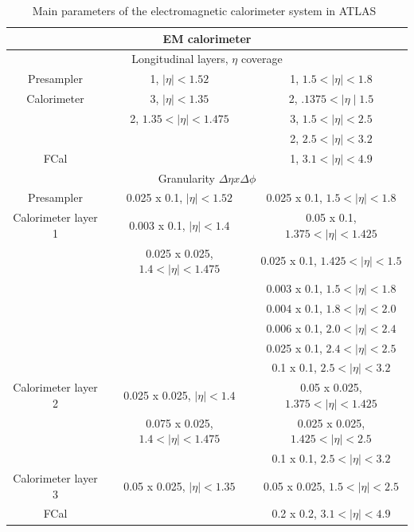 \begin{table}
  \centering
  \begin{tabular}{ |c|c|c|}
  \hline
  \multicolumn{3}{|c|}{\textbf{EM calorimeter}} \\
  \hline
  \hline
  \multicolumn{3}{|c|}{Longitudinal layers, $\eta$ coverage} \\
  \hline
  Presampler  & 1, $\mid\eta\mid<1.52$            & 1, $1.5<\mid\eta\mid<1.8$ \\
  \hline
  Calorimeter & 3, $\mid\eta\mid<1.35$            & 2, $.1375<\mid\eta\mid1.5$ \\
              & 2, $1.35<\mid\eta\mid<1.475$      & 3, $1.5<\mid\eta\mid<2.5$ \\
              &                                   & 2, $2.5<\mid\eta\mid<3.2$ \\
  \hline
  FCal        &                                   & 1, $3.1<\mid\eta\mid < 4.9$ \\
  \hline
  \multicolumn{3}{|c|}{Granularity $\Delta\eta x \Delta\phi$} \\
  \hline
  Presampler  & 0.025 x 0.1, $\mid\eta\mid<1.52$                & 0.025 x 0.1, $1.5<\mid\eta\mid<1.8$ \\
  \hline
  Calorimeter layer 1 & 0.003 x 0.1, $\mid\eta\mid<1.4$         & 0.05 x 0.1,  $1.375<\mid\eta\mid<1.425$ \\
                      & 0.025 x 0.025, $1.4<\mid\eta\mid<1.475$ & 0.025 x 0.1, $1.425<\mid\eta\mid<1.5$ \\
                      &                                         & 0.003 x 0.1, $1.5<\mid\eta\mid<1.8$ \\
                      &                                         & 0.004 x 0.1, $1.8<\mid\eta\mid<2.0$ \\
                      &                                         & 0.006 x 0.1, $2.0<\mid\eta\mid<2.4$ \\
                      &                                         & 0.025 x 0.1, $2.4<\mid\eta\mid<2.5$ \\
                      &                                         & 0.1 x 0.1,   $2.5<\mid\eta\mid<3.2$ \\
  \hline
  Calorimeter layer 2 & 0.025 x 0.025, $\mid\eta\mid<1.4$       & 0.05 x 0.025,$1.375<\mid\eta\mid<1.425$ \\
                      & 0.075 x 0.025, $1.4<\mid\eta\mid<1.475$ & 0.025 x 0.025, $1.425<\mid\eta\mid<2.5$ \\
                      &                                         & 0.1 x 0.1, $2.5<\mid\eta\mid<3.2$ \\
  \hline
  Calorimeter layer 3 & 0.05 x 0.025, $\mid\eta\mid<1.35$       & 0.05 x 0.025, $1.5<\mid\eta\mid<2.5$ \\
  \hline
  FCal                &                                         & 0.2 x 0.2, $3.1<\mid\eta\mid < 4.9$ \\
  \hline
  \end{tabular}
  \caption[Main parameters of the electromagnetic calorimeter system. ]
        {\small Main parameters of the electromagnetic calorimeter system in ATLAS~\cite{JOIATLAS} }
\label{table:EMCalo}
\end{table}
